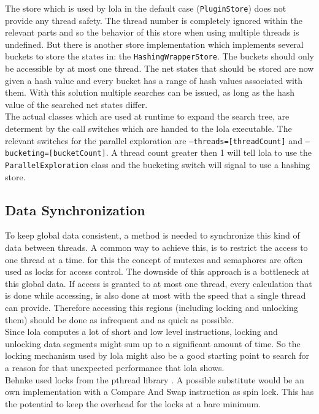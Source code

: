 The store which is used by lola in the default case (\texttt{PluginStore}) does not provide any thread safety. The thread number is completely ignored within the relevant parts and so the behavior of this store when using multiple threads is undefined. But there is another store implementation which implements several buckets to store the states in: the \texttt{HashingWrapperStore}. The buckets should only be accessible by at most one thread. The net states that should be stored are now given a hash value and every bucket has a range of hash values associated with them. With this solution multiple searches can be issued, as long as the hash value of the searched net states differ.\\
The actual classes which are used at runtime to expand the search tree, are determent by the call switches which are handed to the lola executable. The relevant switches for the parallel exploration are \texttt{--threads=[threadCount]} and \texttt{--bucketing=[bucketCount]}. A thread count greater then 1 will tell lola to use the \texttt{ParallelExploration} class and the bucketing switch will signal to use a hashing store.

\subsection{Data Synchronization}
To keep global data consistent, a method is needed to synchronize this kind of data between threads. A common way to achieve this, is to restrict the access to one thread at a time. for this the concept of mutexes and semaphores are often used as locks for access control. The downside of this approach is a bottleneck at this global data. If access is granted to at most one thread, every calculation that is done while accessing, is also done at most with the speed that a single thread can provide. Therefore accessing this regions (including locking and unlocking them) should be done as infrequent and as quick as possible.\\
Since lola computes a lot of short and low level instructions, locking and unlocking data segments might sum up to a significant amount of time. So the locking mechanism used by lola might also be a good starting point to search for a reason for that unexpected performance that lola shows.\\
Behnke used locks from the pthread library \cite{?}. A possible substitute would be an own implementation with a Compare And Swap instruction as spin lock. This has the potential to keep the overhead for the locks at a bare minimum.

